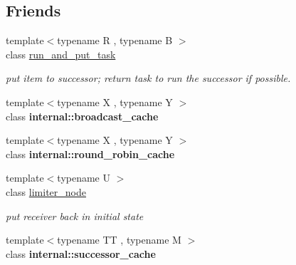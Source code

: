 \subsection*{Friends}
\begin{DoxyCompactItemize}
\item 
\hypertarget{classtbb_1_1flow_1_1interface7_1_1receiver_abaf9bf74ca5f2854d09f5f07337280eb}{}{\footnotesize template$<$typename R , typename B $>$ }\\class \hyperlink{classtbb_1_1flow_1_1interface7_1_1receiver_abaf9bf74ca5f2854d09f5f07337280eb}{run\+\_\+and\+\_\+put\+\_\+task}\label{classtbb_1_1flow_1_1interface7_1_1receiver_abaf9bf74ca5f2854d09f5f07337280eb}

\begin{DoxyCompactList}\small\item\em put item to successor; return task to run the successor if possible. \end{DoxyCompactList}\item 
\hypertarget{classtbb_1_1flow_1_1interface7_1_1receiver_a1360e38efe396058978cf3754ad620f5}{}{\footnotesize template$<$typename X , typename Y $>$ }\\class {\bfseries internal\+::broadcast\+\_\+cache}\label{classtbb_1_1flow_1_1interface7_1_1receiver_a1360e38efe396058978cf3754ad620f5}

\item 
\hypertarget{classtbb_1_1flow_1_1interface7_1_1receiver_acbd9ac2610587a99cd7d43344297cc49}{}{\footnotesize template$<$typename X , typename Y $>$ }\\class {\bfseries internal\+::round\+\_\+robin\+\_\+cache}\label{classtbb_1_1flow_1_1interface7_1_1receiver_acbd9ac2610587a99cd7d43344297cc49}

\item 
\hypertarget{classtbb_1_1flow_1_1interface7_1_1receiver_a05ec930a348f7eed564236d00edbda24}{}{\footnotesize template$<$typename U $>$ }\\class \hyperlink{classtbb_1_1flow_1_1interface7_1_1receiver_a05ec930a348f7eed564236d00edbda24}{limiter\+\_\+node}\label{classtbb_1_1flow_1_1interface7_1_1receiver_a05ec930a348f7eed564236d00edbda24}

\begin{DoxyCompactList}\small\item\em put receiver back in initial state \end{DoxyCompactList}\item 
\hypertarget{classtbb_1_1flow_1_1interface7_1_1receiver_a73cd25db4e6e9497940262f70f3ffc54}{}{\footnotesize template$<$typename T\+T , typename M $>$ }\\class {\bfseries internal\+::successor\+\_\+cache}\label{classtbb_1_1flow_1_1interface7_1_1receiver_a73cd25db4e6e9497940262f70f3ffc54}

\end{DoxyCompactItemize}


